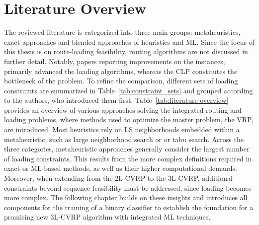 \section{Literature Overview}
\label{sec:literature_overview}
The reviewed literature is categorized into three main groups: metaheuristics, exact approaches and blended approaches of heuristics
and \gls{ML}.
Since the focus of this thesis is on route-loading feasibility, routing algorithms
are not discussed in further detail. Notably, papers reporting improvements on the \gendreauDataSetText instances, primarily
advanced the loading algorithms, whereas the \gls{CLP} constitutes the bottleneck of the problem. To refine the comparison,
different sets of loading constraints are summarized in Table~\ref{tab:constraint_sets}
and grouped according to the authors, who introduced them first.
Table~\ref{tab:literature overview} provides an overview of various approaches solving the integrated routing and loading
problems, where methods used to optimize the master problem, the \gls{VRP}, are introduced.
Most heuristics rely on \gls{LS} neighborhoods embedded within a metaheuristic, such as large neighborhood search or
or tabu search.
Across the three categories, metaheuristic approaches generally consider the largest number of loading constraints. This results
from the more complex definitions required in exact or \gls{ML}-based methods, as well as their higher computational demands.
Moreover, when extending from the \gls{2L-CVRP} to the \gls{3L-CVRP}, additional constraints beyond sequence feasibility must
be addressed, since loading becomes more complex.
The following chapter builds on these insights and introduces all components for the training of a binary classifier
to establish the foundation for a promising new \gls{3L-CVRP} algorithm with integrated \gls{ML} techniques.

